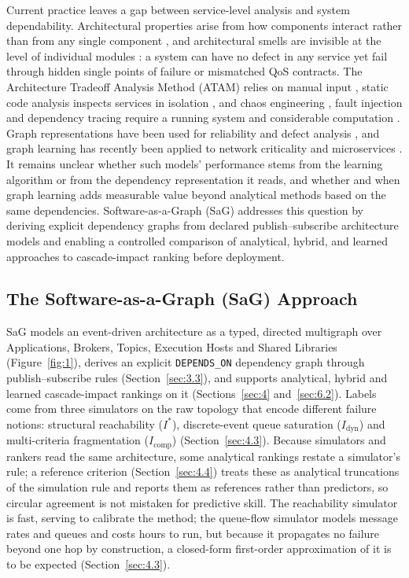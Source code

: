 \documentclass[preprint,3p]{elsarticle}
\begin{document}
Current practice leaves a gap between service-level analysis and system dependability. Architectural properties arise from how components interact rather than from any single component \cite{perry1992foundations}, and architectural smells are invisible at the level of individual modules \cite{garcia2009catalogue}: a system can have no defect in any service yet fail through hidden single points of failure or mismatched QoS contracts. The Architecture Tradeoff Analysis Method (ATAM) relies on manual input \cite{kazman1998atam}, static code analysis inspects services in isolation \cite{sonarsource2024clean,chidamber1994metrics}, and chaos engineering \cite{basiri2016chaos}, fault injection \cite{meiklejohn2021service} and dependency tracing \cite{yu2021microrank} require a running system and considerable computation \cite{verdecchia2023greenai,schwartz2020greenai}. Graph representations have been used for reliability and defect analysis \cite{yacoub2002reliability,zimmermann2008predicting}, and graph learning has recently been applied to network criticality \cite{fan2020keyplayers,fan2019learning} and microservices \cite{khodabandeh2025linkpred}. It remains unclear whether such models' performance stems from the learning algorithm or from the dependency representation it reads, and whether and when graph learning adds measurable value beyond analytical methods based on the same dependencies. Software-as-a-Graph (SaG) addresses this question by deriving explicit dependency graphs from declared publish--subscribe architecture models and enabling a controlled comparison of analytical, hybrid, and learned approaches to cascade-impact ranking before deployment.

\subsection{The Software-as-a-Graph (SaG) Approach}
\label{sec:1.3}

SaG models an event-driven architecture as a typed, directed multigraph over Applications, Brokers, Topics, Execution Hosts and Shared Libraries (Figure~\ref{fig:1}), derives an explicit \texttt{DEPENDS\_ON} dependency graph through publish--subscribe rules (Section~\ref{sec:3.3}), and supports analytical, hybrid and learned cascade-impact rankings on it (Sections~\ref{sec:4} and~\ref{sec:6.2}). Labels come from three simulators on the raw topology that encode different failure notions: structural reachability ($I^*$), discrete-event queue saturation ($I_{\text{dyn}}$) and multi-criteria fragmentation ($I_{\text{comp}}$) (Section~\ref{sec:4.3}). Because simulators and rankers read the same architecture, some analytical rankings restate a simulator's rule; a reference criterion (Section~\ref{sec:4.4}) treats these as analytical truncations of the simulation rule and reports them as references rather than predictors, so circular agreement is not mistaken for predictive skill. The reachability simulator is fast, serving to calibrate the method; the queue-flow simulator models message rates and queues and costs hours to run, but because it propagates no failure beyond one hop by construction, a closed-form first-order approximation of it is to be expected (Section~\ref{sec:4.3}).
\end{document}
